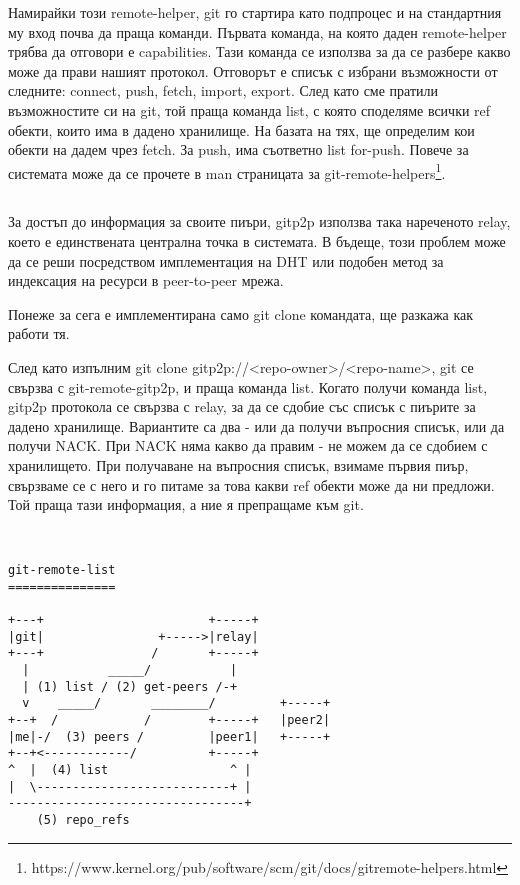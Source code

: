 \documentclass[a4paper,12pt]{article}
\begin{document}
Намирайки този remote-helper, git го стартира като подпроцес и на стандартния
му вход почва да праща команди. Първата команда, на която даден remote-helper
трябва да отговори е capabilities. Тази команда се използва за да се разбере
какво може да прави нашият протокол. Отговорът е списък с избрани възможности
от следните: connect, push, fetch, import, export. След като сме пратили
възможностите си на git, той праща команда list, с която споделяме всички ref 
обекти, които има в дадено хранилище. На базата на тях, ще определим кои обекти
на дадем чрез fetch. За push, има съответно list for-push. Повече за системата
може да се прочете в man страницата за git-remote-helpers\footnote{https://www.kernel.org/pub/software/scm/git/docs/gitremote-helpers.html}.

\subsection{}

За достъп до информация за своите пиъри, gitp2p използва така нареченото relay,
което е единствената централна точка в системата. В бъдеще, този проблем може 
да се реши посредством имплементация на DHT или подобен метод за индексация на
ресурси в peer-to-peer мрежа.

Понеже за сега е имплементирана само git clone командата, ще разкажа как работи
тя.

След като изпълним git clone gitp2p://<repo-owner>/<repo-name>, git се свързва
с git-remote-gitp2p, и праща команда list. Когато получи команда list, gitp2p 
протокола се свързва с relay, за да се сдобие със списък с пиърите за дадено
хранилище. Вариантите са два - или да получи въпросния списък, или да получи
NACK. При NACK няма какво да правим - не можем да се сдобием с хранилището. При
получаване на въпросния списък, взимаме първия пиър, свързваме се с него и го
питаме за това какви ref обекти може да ни предложи. Той праща тази информация,
а ние я препращаме към git.

\begin{verbatim}
 

git-remote-list
===============

+---+                       +-----+
|git|                +----->|relay|
+---+               /       +-----+
  |           _____/           |
  | (1) list / (2) get-peers /-+  
  v    _____/       ________/         +-----+
+--+  /            /        +-----+   |peer2|
|me|-/  (3) peers /         |peer1|   +-----+
+--+<------------/          +-----+
^  |  (4) list                 ^ | 
|  \---------------------------+ |
---------------------------------+
    (5) repo_refs
\end{verbatim}
\end{document}
